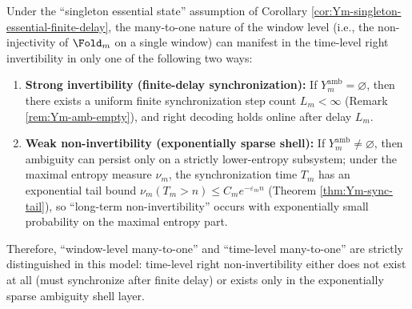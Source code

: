 \begin{corollary}\label{cor:Ym-time-layer-dichotomy}
Under the ``singleton essential state'' assumption of Corollary \ref{cor:Ym-singleton-essential-finite-delay}, the many-to-one nature of the window level (i.e., the non-injectivity of \(\Fold_m\) on a single window) can manifest in the time-level right invertibility in only one of the following two ways:
\begin{enumerate}
  \item \textbf{Strong invertibility (finite-delay synchronization):} If \(Y_m^{\mathrm{amb}}=\varnothing\), then there exists a uniform finite synchronization step count \(L_m<\infty\) (Remark \ref{rem:Ym-amb-empty}), and right decoding holds online after delay \(L_m\).
  \item \textbf{Weak non-invertibility (exponentially sparse shell):} If \(Y_m^{\mathrm{amb}}\neq\varnothing\), then ambiguity can persist only on a strictly lower-entropy subsystem; under the maximal entropy measure \(\nu_m\), the synchronization time \(T_m\) has an exponential tail bound
  \(
  \nu_m(T_m>n)\le C_m e^{-\varepsilon_m n}
  \)
  (Theorem \ref{thm:Ym-sync-tail}), so ``long-term non-invertibility'' occurs with exponentially small probability on the maximal entropy part.
\end{enumerate}
Therefore, ``window-level many-to-one'' and ``time-level many-to-one'' are strictly distinguished in this model: time-level right non-invertibility either does not exist at all (must synchronize after finite delay) or exists only in the exponentially sparse ambiguity shell layer.
\end{corollary}

